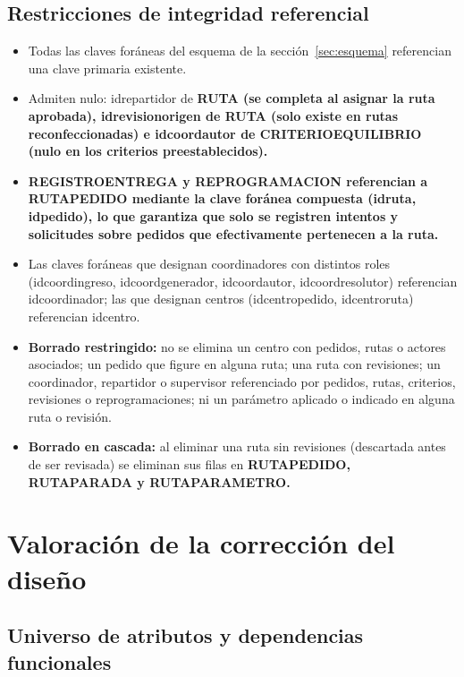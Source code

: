 \documentclass[11pt,a4paper]{article}
\newcommand{\ubrk}{\textunderscore\allowbreak}
\newcommand{\campo}[1]{\textnormal{\ttfamily\let\_\ubrk #1}}
\newcommand{\tabla}[1]{\begingroup\sffamily\bfseries\let\_\ubrk #1\endgroup}
\begin{document}
\subsection{Restricciones de integridad referencial}
\begin{itemize}
\item Todas las claves foráneas del esquema de la sección~\ref{sec:esquema} referencian una clave primaria existente.
\item Admiten nulo: \campo{id\_repartidor} de \tabla{RUTA} (se completa al asignar la ruta aprobada), \campo{id\_revision\_origen} de \tabla{RUTA} (solo existe en rutas reconfeccionadas) e \campo{id\_coord\_autor} de \tabla{CRITERIO\_EQUILIBRIO} (nulo en los criterios preestablecidos).
\item \tabla{REGISTRO\_ENTREGA} y \tabla{REPROGRAMACION} referencian a \tabla{RUTA\_PEDIDO} mediante la clave foránea compuesta (\campo{id\_ruta}, \campo{id\_pedido}), lo que garantiza que solo se registren intentos y solicitudes sobre pedidos que efectivamente pertenecen a la ruta.
\item Las claves foráneas que designan coordinadores con distintos roles (\campo{id\_coord\_ingreso}, \campo{id\_coord\_generador}, \campo{id\_coord\_autor}, \campo{id\_coord\_resolutor}) referencian \campo{id\_coordinador}; las que designan centros (\campo{id\_centro\_pedido}, \campo{id\_centro\_ruta}) referencian \campo{id\_centro}.
\item \textbf{Borrado restringido:} no se elimina un centro con pedidos, rutas o actores asociados; un pedido que figure en alguna ruta; una ruta con revisiones; un coordinador, repartidor o supervisor referenciado por pedidos, rutas, criterios, revisiones o reprogramaciones; ni un parámetro aplicado o indicado en alguna ruta o revisión.
\item \textbf{Borrado en cascada:} al eliminar una ruta sin revisiones (descartada antes de ser revisada) se eliminan sus filas en \tabla{RUTA\_PEDIDO}, \tabla{RUTA\_PARADA} y \tabla{RUTA\_PARAMETRO}.
\end{itemize}

\section{Valoración de la corrección del diseño}\label{sec:valoracion}

\subsection{Universo de atributos y dependencias funcionales}
\end{document}
